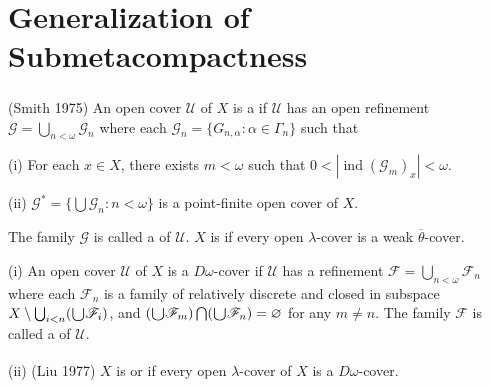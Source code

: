 \documentclass[ch3.tex]{subfiles}
\begin{document}
\section{Generalization of Submetacompactness} \label{sec:3.2}

{ \label{def:3.2.1}
	\textup{(\hstretch{1.8}{[}Smith 1975\hstretch{1.8}{]}\textsuperscript{\cite{Smith1975}})} 
An open cover $\mathscr{U}$ of $X$ is a 
if $\mathscr{U}$ has an open refinement $\mathscr{G} = \bigcup_{n < \omega} \mathscr{G}_n$ where each $\mathscr{G}_n = \{G_{n, \alpha}: \alpha \in \Gamma_n\}$ such that

\textup{(i)}
For each $x \in X$, there exists $m<\omega$ such that 
$0 < |\operatorname{ind}(\mathscr{G}_m)_x|  < \omega$.

\textup{(ii)}
$\mathscr{G}^* = \{\bigcup \mathscr{G}_n: n < \omega\}$ is a point-finite open cover of $X$.

\noindent The family $\mathscr{G}$ is called a 
of $\mathscr{U}$.  $X$ is 
if every open $\lambda$-cover is a weak $\overline{\theta}$-cover.
}

{ \label{def:3.2.2}
\textup{(i)}
An open cover $\mathscr{U}$ of $X$ is a $D\omega$-cover if $\mathscr{U}$ 
has a refinement $\mathscr{F} = \bigcup_{n < \omega} \mathscr{F}_n$ where each 
$\mathscr{F}_n$ is a family of relatively discrete and closed in subspace 
$X \setminus\bigcup_{i< n}( \raisebox{-2pt}{\scalebox{1.5}{$\cup$}} \mathscr{F}_i)$, and 
$( \raisebox{-2pt}{\scalebox{1.5}{$\cup$}}\mathscr{F}_m)\bigcap( \raisebox{-2pt}{\scalebox{1.5}{$\cup$}}\mathscr{F}_n) = \varnothing$ for any $m\ne n$.
The family $\mathscr{F}$ is called a 
of $\mathscr{U}.$

\textup{(ii)}
\textup{(\hstretch{1.8}{[}Liu 1977\hstretch{1.8}{]}\textsuperscript{\cite{Liu}})} 
$X$ is 
or 
if every open $\lambda$-cover of $X$ is a $D\omega$-cover.
}
\end{document}

